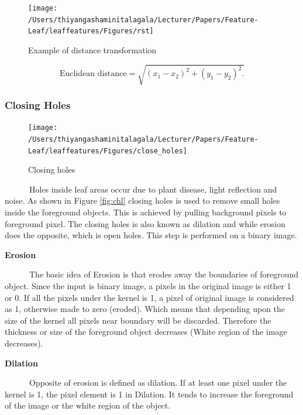 \documentclass{article}
\begin{document}
\begin{figure}[!ht]

{\centering \texttt{[image: /Users/thiyangashaminitalagala/Lecturer/Papers/Feature-Leaf/leaffeatures/Figures/rst]} 

}

\caption{\label{fig:rstex}Example of distance transformation}\label{fig:unnamed-chunk-8}
\end{figure}

\begin{equation}
    \text{Euclidean distance} = \sqrt{(x_1 - x_2)^2 + (y_1 - y_2)^2.}
    \label{eu}
\end{equation}

\hypertarget{closing-holes}{%
\subsubsection{Closing Holes}\label{closing-holes}}

\begin{figure}[!ht]

{\centering \texttt{[image: /Users/thiyangashaminitalagala/Lecturer/Papers/Feature-Leaf/leaffeatures/Figures/close\_holes]} 

}

\caption{\label{fig:chl}Closing holes}\label{fig:unnamed-chunk-9}
\end{figure}

~~~~~~Holes inside leaf areas occur due to plant disease, light
reflection and noise. As shown in Figure \ref{fig:chl} closing holes is
used to remove small holes inside the foreground objects. This is
achieved by pulling background pixels to foreground pixel. The closing
holes is also known as dilation and while erosion does the opposite,
which is open holes. This step is performed on a binary image.

\textbf{Erosion}

~~~~~~The basic idea of Erosion is that erodes away the boundaries of
foreground object. Since the input is binary image, a pixels in the
original image is either 1 or 0. If all the pixels under the kernel is
1, a pixel of original image is considered as 1, otherwise made to zero
(eroded). Which means that depending upon the size of the kernel all
pixels near boundary will be discarded. Therefore the thickness or size
of the foreground object decreases (White region of the image
decreases).

\textbf{Dilation}

~~~~~~Opposite of erosion is defined as dilation. If at least one pixel
under the kernel is 1, the pixel element is 1 in Dilation. It tends to
increase the foreground of the image or the white region of the object.
\end{document}
